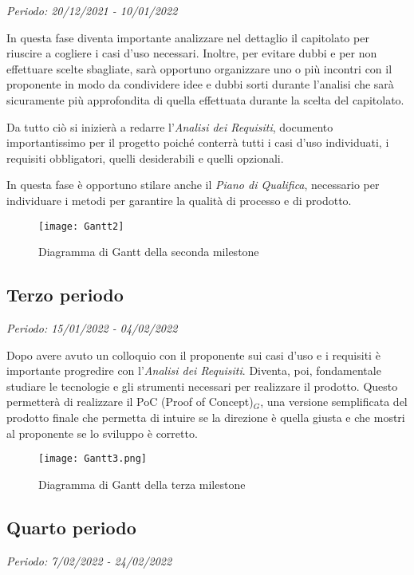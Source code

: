 \textit{Periodo: 20/12/2021 - 10/01/2022}

In questa fase diventa importante analizzare nel dettaglio il capitolato per riuscire a
cogliere i casi d'uso necessari. Inoltre, per evitare dubbi e per non effettuare
scelte sbagliate, sarà opportuno organizzare uno o più incontri con il proponente in modo da
condividere idee e dubbi sorti durante l'analisi che sarà sicuramente più approfondita di quella
effettuata durante la scelta del capitolato.
\par Da tutto ciò si inizierà a redarre l'\textit{Analisi dei Requisiti}, documento importantissimo per il progetto poiché
conterrà tutti i casi d'uso individuati, i requisiti obbligatori, quelli desiderabili e quelli opzionali.
\par In questa fase è opportuno stilare anche il \textit{Piano di Qualifica}, necessario per individuare
i metodi per garantire la qualità di processo e di prodotto.

\begin{figure}[!ht]
    \texttt{[image: Gantt2]}
    \caption{Diagramma di Gantt della seconda milestone} 
\end{figure}

\subsection{Terzo periodo}

\textit{Periodo: 15/01/2022 - 04/02/2022}

Dopo avere avuto un colloquio con il proponente sui casi d'uso e i requisiti è importante progredire con
l'\textit{Analisi dei Requisiti}. Diventa, poi, fondamentale studiare le tecnologie e gli strumenti necessari
per realizzare il prodotto. Questo permetterà di realizzare il PoC (Proof of Concept)$_G$, una versione semplificata 
del prodotto finale che permetta di intuire se la direzione è quella giusta e che mostri al proponente se lo 
sviluppo è corretto.

\begin{figure}[!ht]
    \texttt{[image: Gantt3.png]}
    \caption{Diagramma di Gantt della terza milestone} 
\end{figure}


\subsection{Quarto periodo}
\textit{Periodo: 7/02/2022 - 24/02/2022}

